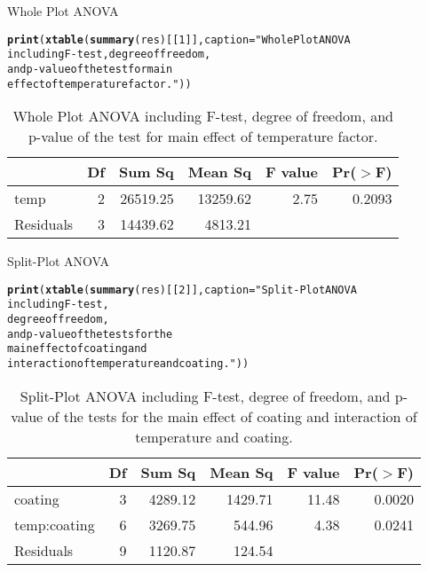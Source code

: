 \documentclass{article}\usepackage[]{graphicx}\usepackage[]{color}
\makeatletter
\newcommand{\hlnum}[1]{\textcolor[rgb]{0.686,0.059,0.569}{#1}}%
\newcommand{\hlstr}[1]{\textcolor[rgb]{0.192,0.494,0.8}{#1}}%
\newcommand{\hlstd}[1]{\textcolor[rgb]{0.345,0.345,0.345}{#1}}%
\newcommand{\hlkwc}[1]{\textcolor[rgb]{0.333,0.667,0.333}{#1}}%
\newcommand{\hlkwd}[1]{\textcolor[rgb]{0.737,0.353,0.396}{\textbf{#1}}}%
\newenvironment{kframe}{%
 \def\at@end@of@kframe{}%
 \ifinner\ifhmode%
  \def\at@end@of@kframe{\end{minipage}}%
  \begin{minipage}{\columnwidth}%
 \fi\fi%
 \def\FrameCommand##1{\hskip\@totalleftmargin \hskip-\fboxsep
 \colorbox{shadecolor}{##1}\hskip-\fboxsep
     \hskip-\linewidth \hskip-\@totalleftmargin \hskip\columnwidth}%
 \MakeFramed {\advance\hsize-\width
   \@totalleftmargin\z@ \linewidth\hsize
   \@setminipage}}%
 {\par\unskip\endMakeFramed%
 \at@end@of@kframe}
\makeatother
\begin{document}
Whole Plot ANOVA
\begin{kframe}
\begin{alltt}
\hlkwd{print}\hlstd{(}\hlkwd{xtable}\hlstd{(}\hlkwd{summary}\hlstd{(res)[[}\hlnum{1}\hlstd{]],} \hlkwc{caption} \hlstd{=} \hlstr{"Whole Plot ANOVA 
             including F-test, degree of freedom,
             and p-value of the test for main 
             effect of temperature factor."}\hlstd{))}
\end{alltt}
\end{kframe}%
\begin{table}[ht]
\centering
\begin{tabular}{lrrrrr}
  \hline
 & Df & Sum Sq & Mean Sq & F value & Pr($>$F) \\ 
  \hline
temp      & 2 & 26519.25 & 13259.62 & 2.75 & 0.2093 \\ 
  Residuals & 3 & 14439.62 & 4813.21 &  &  \\ 
   \hline
\end{tabular}
\caption{Whole Plot ANOVA 
             including F-test, degree of freedom,
             and p-value of the test for main 
             effect of temperature factor.} 
\end{table}


Split-Plot ANOVA 

\begin{kframe}
\begin{alltt}
\hlkwd{print}\hlstd{(}\hlkwd{xtable}\hlstd{(}\hlkwd{summary}\hlstd{(res)[[}\hlnum{2}\hlstd{]],} \hlkwc{caption} \hlstd{=} \hlstr{"Split-Plot ANOVA 
             including F-test, 
             degree of freedom,
             and p-value of the tests for the 
             main effect of coating and 
             interaction of temperature and coating."}\hlstd{))}
\end{alltt}
\end{kframe}%
\begin{table}[ht]
\centering
\begin{tabular}{lrrrrr}
  \hline
 & Df & Sum Sq & Mean Sq & F value & Pr($>$F) \\ 
  \hline
coating      & 3 & 4289.12 & 1429.71 & 11.48 & 0.0020 \\ 
  temp:coating & 6 & 3269.75 & 544.96 & 4.38 & 0.0241 \\ 
  Residuals    & 9 & 1120.87 & 124.54 &  &  \\ 
   \hline
\end{tabular}
\caption{Split-Plot ANOVA 
             including F-test, 
             degree of freedom,
             and p-value of the tests for the 
             main effect of coating and 
             interaction of temperature and coating.} 
\end{table}
\end{document}
